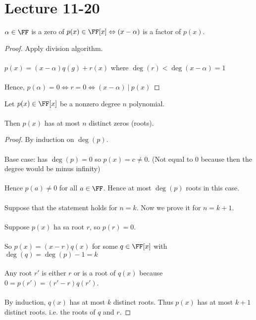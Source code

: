 \documentclass[class=scrartcl, crop=false]{standalone}
\date{2019-11-20}
\begin{document}
\section{Lecture 11-20}

\begin{corollary}
  $\alpha \in \FF$ is a zero of $p(x) \in \FF[x] \Leftrightarrow (x - \alpha)$ is a factor of $p(x)$.
  \begin{proof}
    Apply division algorithm. \\\\
    $p(x) = (x - \alpha)q(g) + r(x)$ where  $\deg(r) < \deg(x - \alpha) = 1$
    \\\\
    Hence,  $p(\alpha) = 0 \Leftrightarrow r = 0 \Leftrightarrow (x - \alpha) \ | \ p(x)$
  \end{proof} 
\end{corollary} 

\begin{theorem}
  Let $p(x) \in \FF[x]$ be a nonzero degree $n$ polynomial.
  \\\\
  Then $p(x)$ has at most $n$ distinct zeros (roots).
  \begin{proof}
    By induction on $\deg(p)$.
    \\\\
    Base case: has $\deg(p) = 0$ so $p(x) = c \neq 0$.  (Not equal to 0 because then the degree would be minus infinity)
    \\\\
    Hence $p(a) \neq 0$ for all $a \in \FF$. Hence at most $\deg(p)$ roots in this case.
    \\\\
    Suppose that the statement holds for $n = k$. Now we prove it for $n = k + 1$.
    \\\\
    Suppose $p(x)$ ha sa root $r$, so $p(r) = 0$.
    \\\\
    So $p(x) = (x - r)q(x)$ for some $q \in \FF[x]$ with $\deg(q) = \deg(p) - 1 = k$
    \\\\
    Any root $r'$ is either $r$ or is a root of $q(x)$ because $0 = p(r') = (r' - r)q(r')$.
    \\\\
    By induction, $q(x)$ has at most $k$ distinct roots. Thus $p(x)$ has at most $k + 1$ distinct roots. i.e. the roots of $q$ and $r$.
  \end{proof} 
\end{theorem} 
\end{document}
